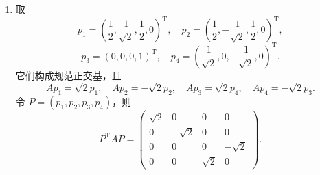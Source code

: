 \begin{enumerate}
\begin{enumerate}
        \item 取
        \[
            p_1=\left(\frac12,\frac1{\sqrt2},\frac12,0\right)^{\mathrm{T}},\quad
            p_2=\left(\frac12,-\frac1{\sqrt2},\frac12,0\right)^{\mathrm{T}},
        \]
        \[
            p_3=(0,0,0,1)^{\mathrm{T}},\quad
            p_4=\left(\frac1{\sqrt2},0,-\frac1{\sqrt2},0\right)^{\mathrm{T}}.
        \]
        它们构成规范正交基，且
        \[
            Ap_1=\sqrt2p_1,\quad Ap_2=-\sqrt2p_2,\quad
            Ap_3=\sqrt2p_4,\quad Ap_4=-\sqrt2p_3.
        \]
        令 $P=(p_1,p_2,p_3,p_4)$，则
        \[
            P^{\mathrm{T}}AP=
            \begin{pmatrix}
                \sqrt2&0&0&0\\
                0&-\sqrt2&0&0\\
                0&0&0&-\sqrt2\\
                0&0&\sqrt2&0
            \end{pmatrix}.
        \]
    \end{enumerate}
\end{enumerate}

\clearpage
